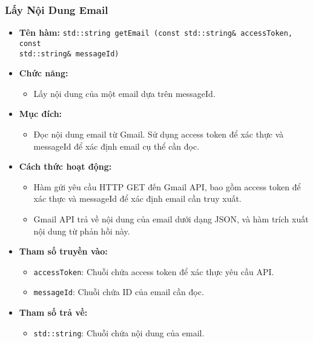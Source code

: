 \subsubsection{Lấy Nội Dung Email}
\begin{itemize}
    \item \textbf{Tên hàm:} \texttt{std::string getEmail (const std::string\& accessToken, const \\std::string\& messageId)}
    \item \textbf{Chức năng:} 
    \begin{itemize}
        \item Lấy nội dung của một email dựa trên messageId.
    \end{itemize}
    \item \textbf{Mục đích:} 
    \begin{itemize}
        \item Đọc nội dung email từ Gmail. Sử dụng access token để xác thực và messageId để xác định email cụ thể cần đọc.
    \end{itemize}
    \item \textbf{Cách thức hoạt động:} 
    \begin{itemize}
        \item Hàm gửi yêu cầu HTTP GET đến Gmail API, bao gồm access token để xác thực và messageId để xác định email cần truy xuất.
        \item Gmail API trả về nội dung của email dưới dạng JSON, và hàm trích xuất nội dung từ phản hồi này.
    \end{itemize}
    \item \textbf{Tham số truyền vào:} 
    \begin{itemize}
        \item \texttt{accessToken}: Chuỗi chứa access token để xác thực yêu cầu API.
        \item \texttt{messageId}: Chuỗi chứa ID của email cần đọc.
    \end{itemize}
    \item \textbf{Tham số trả về:} 
    \begin{itemize}
        \item \texttt{std::string}: Chuỗi chứa nội dung của email.
    \end{itemize}
\end{itemize}

